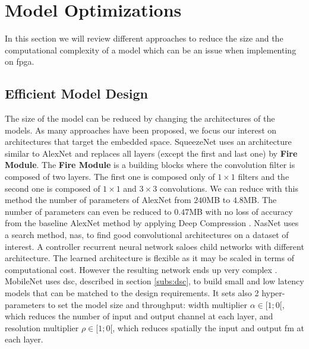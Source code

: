 \section{Model Optimizations} \label{sec:mdopti}
 In this section we will review different approaches to reduce the size and the computational complexity of a model which can be an issue when implementing on \acrshort{fpga}.
\subsection{Efficient Model Design}
The size of the model can be reduced by changing the architectures of the models. As many approaches have been proposed, we focus our interest on architectures that target the embedded space. \newline \newline
%
SqueezeNet \cite{iandola_squeezenet_2016} uses an architecture similar to AlexNet and replaces all layers (except the first and last one) by \textbf{Fire Module}. The \textbf{Fire Module} is a building blocks where the convolution filter is composed of two layers. The first one is composed only of $1 \times 1$ filters and the second one is composed of $1 \times 1$ and $3 \times 3$ convolutions. We can reduce with this method the number of parameters of AlexNet from $240$MB to $4.8$MB. The number of parameters can even be reduced to $0.47$MB with no loss of accuracy from the baseline AlexNet method by applying Deep Compression \cite{han_deep_2016}. \newline \newline
%
NasNet \cite{zoph_learning_2018} uses a search method, \acrfull{nas}, to find good convolutional architectures on a dataset of interest. A controller recurrent neural network saloes child networks with different architecture. The learned architecture is flexible as it may be scaled in terms of computational cost. However the resulting network ends up very complex \cite{sandler_mobilenetv2_2019}.\newline \newline
%
MobileNet \cite{howard_mobilenets_2017} uses \acrshort{dsc}, described in section \ref{subs:dsc}, to build small and low latency models that can be matched to the design requirements. It sets also 2 hyper-parameters to set the model size and throughput: width multiplier $\alpha \in [1; 0[$, which reduces the number of input and output channel at each layer, and resolution multiplier $\rho \in [1; 0[$,  which reduces spatially the input and output \acrshort{fm} at each layer.\newline \newline
